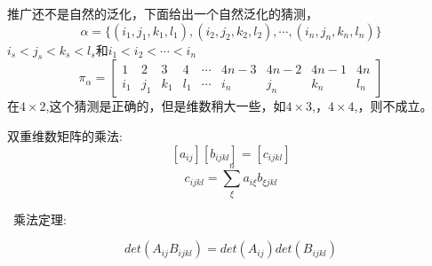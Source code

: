 \documentclass{amsc}          %
\numberwithin{equation}{section} %
\begin{document}
推广还不是自然的泛化，下面给出一个自然泛化的猜测，
$$\alpha =\{(i_{1},j_{1},k_{1},l_{1}),(i_{2},j_{2},k_{2},l_{2}),\cdots ,(i_{n},j_{n},k_{n},l_{n})\}$$
$i_{s}<j_{s}<k_{s}<l_{s}$和$i_{1}<i_{2}<\cdots <i_{n}$
$${\displaystyle \pi _{\alpha }={\begin{bmatrix}1&2&3&4&\cdots &4n-3&4n-2&4n-1&4n\\i_{1}&j_{1}&k_{1}&l_{1}&\cdots &i_{n}&j_{n}&k_{n}&l_{n}\end{bmatrix}}}$$
在$4 \times 2$,\cite{VAL42}这个猜测是正确的，但是维数稍大一些，如$4 \times 3$,\cite{VAL34}，$4 \times 4$,\cite{VAL44}，则不成立。


\begin{definition}  双重维数矩阵的乘法:
   $$[a_{ij}][b_{ijkl}]=[c_{ijkl}]$$
   $$c_{ijkl} = \sum_{\xi}^{n}a_{i\xi}b_{\xi jkl}$$
\end{definition}

\begin{theorem}\   乘法定理:

    $$det(A_{ij}B_{ijkl})=det(A_{ij})det(B_{ijkl})$$
\end{theorem}
\end{document}
